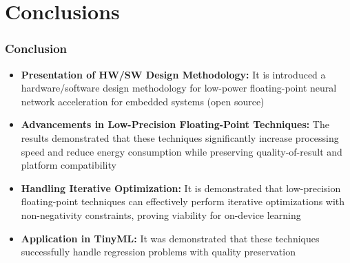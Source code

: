 \section{Conclusions}
\tableofcontents[currentsection]
\begin{frame}[t]
	\frametitle{Conclusion}
	
\begin{itemize}
	\item <1-> \textbf{Presentation of HW/SW Design Methodology:} It is introduced a hardware/software design methodology for low-power floating-point neural network acceleration for embedded systems (open source)
	
	\item<2-> \textbf{Advancements in Low-Precision Floating-Point Techniques:} The results demonstrated that these techniques significantly increase processing speed and reduce energy consumption while preserving quality-of-result and platform compatibility
	
	\item<3-> \textbf{Handling Iterative Optimization:} It is demonstrated that low-precision floating-point techniques can effectively perform iterative optimizations with non-negativity constraints, proving viability for on-device learning
	
	\item<4-> \textbf{Application in TinyML:} It was demonstrated that these techniques successfully handle regression problems with quality preservation
\end{itemize}

\end{frame}